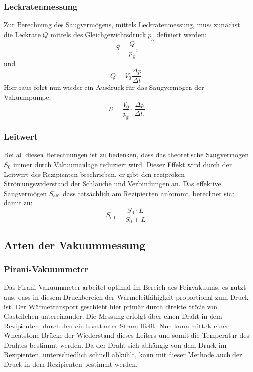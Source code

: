 		\subsubsection{Leckratenmessung}
			
			Zur Berechnung des Saugvermögens, mittels Leckratenmessung, muss zunächst die Leckrate $Q$ mittels des Gleichgewichtsdruck $p_\text{g}$ definiert werden:
			\begin{equation}
				S = \frac{Q}{p_\text{g}},
			\end{equation}
			und
			\begin{equation}
				Q = V_0 \frac{\Delta p}{\Delta t}.
			\end{equation}
			Hier raus folgt nun wieder ein Ausdruck für das Saugvermögen der Vakuumpumpe:
			\begin{equation}
				S = \frac{V_0}{p_\text{g}} \cdot \frac{\Delta p}{\Delta t.}
			\end{equation}
		\subsubsection{Leitwert}

			Bei all diesen Berechnungen ist zu bedenken, dass das theoretische Saugvermögen $S_0$ immer durch Vakuumanlage reduziert wird.
			Dieser Effekt wird durch den Leitwert des Rezipienten beschrieben, er gibt den reziproken Strömungswiderstand der Schläuche und Verbindungen an.
			Das effektive Saugvermögen $S_\text{eff}$, dass tatsächlich am Rezipienten ankommt, berechnet sich damit zu:
			\begin{equation}
				S_\text{eff} = \frac{S_0 \cdot L}{S_0 + L}.
			\end{equation}

	\subsection{Arten der Vakuummessung}
		
		\subsubsection{Pirani-Vakuummeter}
			
			Das Pirani-Vakuummeter arbeitet optimal im Bereich des Feinvakuums, es nutzt aus, dass in diesem Druckbereich der Wärmeleitfähigkeit proportional zum Druck ist. 
			Der Wärmetransport geschieht hier primär durch direkte Stöße von Gasteilchen untereinander. 
			Die Messung erfolgt über einen Draht in dem Rezipienten, durch den ein konstanter Strom fließt.
			Nun kann mittels einer Wheatstone-Brücke der Wiederstand dieses Leiters und somit die Temperatur des Drahtes bestimmt werden.
			Da der Draht sich abhängig von dem Druck im Rezipienten, unterschiedlich schnell abkühlt, kann mit dieser Methode auch der Druck in dem Rezipienten bestimmt werden.

